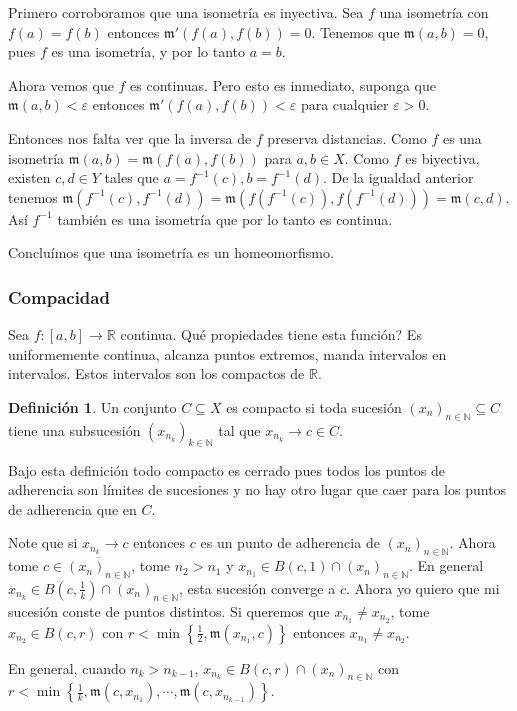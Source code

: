 \documentclass[12pt]{article}
\theoremstyle{plain}
\theoremstyle{definition}
\newtheorem{Def}[Th]{Definición}       %
\theoremstyle{remark}
\numberwithin{equation}{section}
\newcommand{\bN}{\mathbb{N}}        %
\newcommand{\bR}{\mathbb{R}}        %
\newcommand{\mm}{\mathfrak{m}}      %
\renewcommand{\:}{\colon}           %
\newcommand{\conj}[1]{\left\lbrace#1\right\rbrace}
\newcommand{\bonj}[1]{\left\lbrack#1\right\rbrack}
\begin{document}
\begin{multicols}{2}
\begin{ptcb}
Primero corroboramos que una isometría es inyectiva. Sea $f$ una isometría con $f(a)=f(b)$ entonces $\mm'(f(a),f(b))=0$. Tenemos que $\mm(a,b)=0$, pues $f$ es una isometría, y por lo tanto $a=b$.\par
Ahora vemos que $f$ es continuas. Pero esto es inmediato, suponga que $\mm(a,b)<\varepsilon$ entonces $\mm'(f(a),f(b))<\varepsilon$ para cualquier $\varepsilon>0$.\par
Entonces nos falta ver que la inversa de $f$ preserva distancias. Como $f$ es una isometría $\mm(a,b)=\mm(f(a),f(b))$ para $a,b\in X$. Como $f$ es biyectiva, existen $c,d\in Y$ tales que $a=f^{-1}(c), b=f^{-1}(d)$. De la igualdad anterior tenemos $\mm(f^{-1}(c),f^{-1}(d))=\mm(f(f^{-1}(c)),f(f^{-1}(d)))=\mm(c,d)$. Así $f^{-1}$ también es una isometría que por lo tanto es continua. \par
Concluímos que una isometría es un homeomorfismo.
\end{ptcb}

\subsubsection*{Compacidad}

Sea $f\colon\bonj{a,b}\to \bR$ continua. Qué propiedades tiene esta función? Es uniformemente continua, alcanza puntos extremos, manda intervalos en intervalos. Estos intervalos son los compactos de $\bR$.

\begin{Def}\label{defCompacto}
  Un conjunto $C\subseteq X$ es compacto si toda sucesión $(x_n)_{n\in\bN}\subseteq C$ tiene una subsucesión $(x_{n_k})_{k\in\bN}$ tal que $x_{n_k}\to c\in C$.
\end{Def}

Bajo esta definición todo compacto es cerrado pues todos los puntos de adherencia son límites de sucesiones y no hay otro lugar que caer para los puntos de adherencia que en $C$.

Note que si $x_{n_k}\to c$ entonces $c$ es un punto de adherencia de $(x_n)_{n\in\bN}$.
Ahora tome $c\in\overline{(x_n)_{n\in\bN}}$, tome $n_2> n_1$ y $x_{n_1}\in B(c,1)\cap(x_n)_{n\in\bN}$. En general $x_{n_k}\in B(c,\frac{1}{k})\cap(x_n)_{n\in\bN}$, esta sucesión converge a $c$. Ahora yo quiero que mi sucesión conste de puntos distintos. Si queremos que $x_{n_1}\neq x_{n_2}$, tome $x_{n_2}\in B(c,r)$ con $r<\min\conj{\frac{1}{2},\mm(x_{n_1},c)}$ entonces $x_{n_1}\neq x_{n_2}$.\par
En general, cuando $n_k>n_{k-1}$, $x_{n_k}\in B(c,r)\cap (x_n)_{n\in\bN}$ con $r <\min\conj{\frac{1}{k},\mm(c,x_{n_1}),\cdots,\mm(c,x_{n_{k-1}})}$.


\end{multicols}
\end{document}
